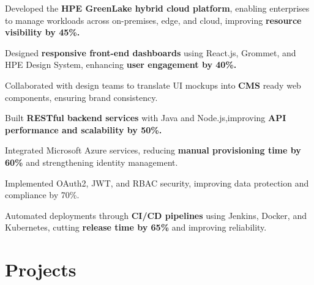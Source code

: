 \documentclass[letterpaper,10pt]{article}
\newenvironment{resume_list}{
  \vspace{-7pt}
  \begin{itemize}[itemsep=-1.5px, parsep=1pt, leftmargin=10pt]
}{
  \end{itemize}
}
\begin{document}
  \begin{resume_list}
    
    \item Developed the \textbf{HPE GreenLake hybrid cloud platform}, enabling enterprises to manage workloads across on-premises, edge, and cloud, improving \textbf{resource visibility by 45\%.}
    \vspace{1.5pt}
    \item Designed \textbf{responsive front-end dashboards} using React.js, Grommet, and HPE Design System, enhancing \textbf{user engagement by 40\%.}
    \vspace{1.5pt}
    \item Collaborated with design teams to translate UI mockups into \textbf{CMS} ready web components, ensuring brand consistency.
    \vspace{1.5pt}
    \item Built \textbf{RESTful backend services} with Java and Node.js,improving \textbf{API performance and scalability by 50\%.}
    \vspace{1.5pt}
    \item Integrated Microsoft Azure services, reducing \textbf{manual provisioning time by 60\%} and strengthening identity management.
    \vspace{1.5pt}
    \item Implemented OAuth2, JWT, and RBAC security, improving data protection and compliance by 70\%.
    \vspace{1.5pt}
    \item Automated deployments through \textbf{CI/CD pipelines} using Jenkins, Docker, and Kubernetes, cutting \textbf{release time by 65\%} and improving reliability.
  \end{resume_list}



  





  \section{Projects}
\end{document}
